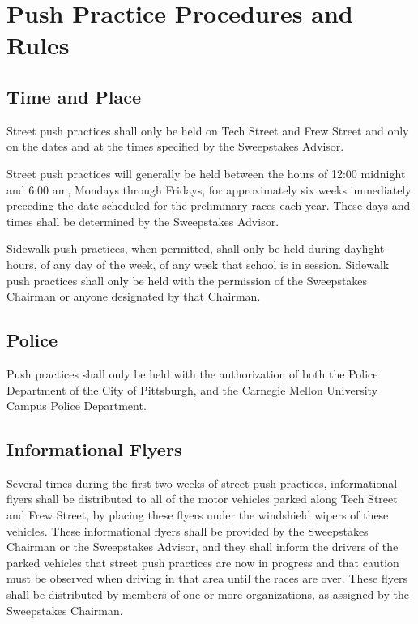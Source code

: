 \section{Push Practice Procedures and Rules}

\subsection{Time and Place}

	Street push practices shall only be held on Tech Street and Frew Street and
	only on the dates and at the times specified by the Sweepstakes Advisor.

	Street push practices will generally be held between the hours of 12:00
	midnight and 6:00 am, Mondays through Fridays, for approximately six weeks
	immediately preceding the date scheduled for the preliminary races each year.
	These days and times shall be determined by the Sweepstakes Advisor.

	Sidewalk push practices, when permitted, shall only be held during daylight
	hours, of any day of the week, of any week that school is in session. Sidewalk
	push practices shall only be held with the permission of the Sweepstakes
	Chairman or anyone designated by that Chairman.

\subsection{Police}

	Push practices shall only be held with the authorization of both the Police
	Department of the City of Pittsburgh, and the Carnegie Mellon University Campus
	Police Department.

\subsection{Informational Flyers}

	Several times during the first two weeks of street push practices,
	informational flyers shall be distributed to all of the motor vehicles parked
	along Tech Street and Frew Street, by placing these flyers under the windshield
	wipers of these vehicles. These informational flyers shall be provided by the
	Sweepstakes Chairman or the Sweepstakes Advisor, and they shall inform the
	drivers of the parked vehicles that street push practices are now in progress
	and that caution must be observed when driving in that area until the races are
	over. These flyers shall be distributed by members of one or more
	organizations, as assigned by the Sweepstakes Chairman.

